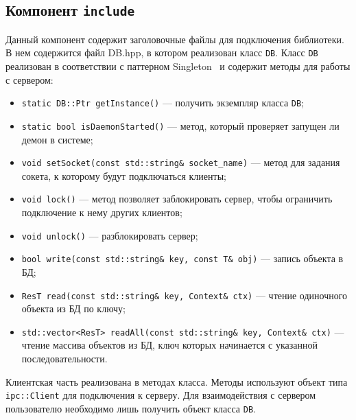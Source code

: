 \subsection{Компонент \texttt{include}}
Данный компонент содержит заголовочные файлы для подключения библиотеки. В нем содержится файл DB.hpp, в котором реализован класс \texttt{DB}. Класс \texttt{DB} реализован в соответствии с паттерном Singleton~\cite{patterns} и содержит методы для работы с сервером:
\begin{itemize}
\item \texttt{static DB::Ptr getInstance()} --- получить экземпляр класса \texttt{DB};
\item \texttt{static bool isDaemonStarted()} --- метод, который проверяет запущен ли демон в системе;
\item \texttt{void setSocket(const std::string\& socket_name)} --- метод для задания сокета, к которому будут подключаться клиенты;
\item \texttt{void lock()} --- метод позволяет заблокировать сервер, чтобы ограничить подключение к нему других клиентов;
\item \texttt{void unlock()} --- разблокировать сервер;
\item \texttt{bool write(const std::string\& key, const T\& obj)} --- запись объекта в БД;
\item \texttt{ResT read(const std::string\& key, Context\& ctx)} --- чтение одиночного объекта из БД по ключу;
\item \texttt{std::vector<ResT> readAll(const std::string\& key, Context\& ctx)} --- чтение массива объектов из БД, ключ которых начинается с указанной последовательности.
\end{itemize}
Клиентская часть реализована в методах класса. Методы используют объект типа \texttt{ipc::Client} для подключения к серверу. Для взаимодействия с сервером пользователю необходимо лишь получить объект класса \texttt{DB}.


